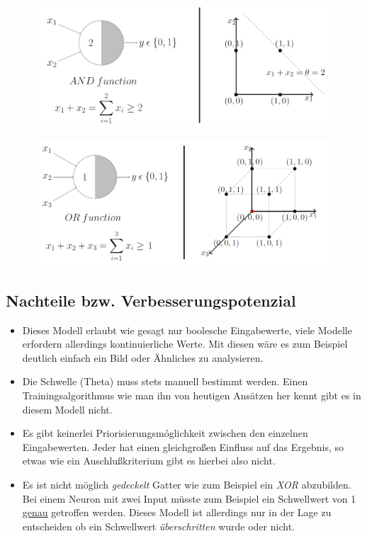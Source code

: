
\begin{figure}[!htb]
	\centering
	\includegraphics[width=\linewidth]{img/mpn_and}
	\label{fig:mpn_and}
\end{figure}

\begin{figure}[!htb]
	\centering
	\includegraphics[width=\linewidth]{img/mpn_or}
	\label{fig:mpn_or}
\end{figure}


\subsection{Nachteile bzw. Verbesserungspotenzial}

\begin{minipage}{\textwidth}
\begin{itemize}
\item Dieses Modell erlaubt wie gesagt nur boolesche Eingabewerte, viele Modelle erfordern allerdings kontinuierliche Werte. Mit diesen wäre es zum Beispiel deutlich einfach ein Bild oder Ähnliches zu analysieren.
\item Die Schwelle (Theta) muss stets manuell bestimmt werden. Einen Trainingsalgorithmus wie man ihn von heutigen Ansätzen her kennt gibt es in diesem Modell nicht. 
\item Es gibt keinerlei Priorisierungsmóglichkeit zwischen den einzelnen Eingabewerten. Jeder hat einen gleichgroßen Einfluss auf das Ergebnis, so etwas wie ein Auschlußkriterium gibt es hierbei also nicht. 
\item Es ist nicht möglich \emph{gedeckelt} Gatter wie zum Beispiel ein \emph{XOR} abzubilden. Bei einem Neuron mit zwei Input müsste zum Beispiel ein Schwellwert von 1 \underline{genau} getroffen werden. Dieses Modell ist allerdings nur in der Lage zu entscheiden ob ein Schwellwert \emph{überschritten} wurde oder nicht. 
\end{itemize}
\end{minipage}

